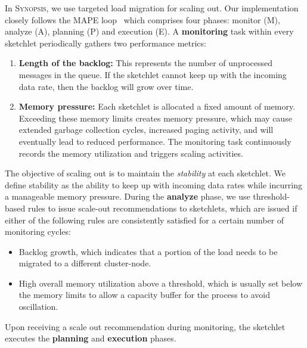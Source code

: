 In \textsc{Synopsis}, we use targeted load migration for scaling out.
Our implementation closely follows the MAPE loop~\cite{maurer2011revealing} which comprises four phases: monitor (M), analyze (A), planning (P) and execution (E).
A \textbf{monitoring} task within every sketchlet periodically gathers two performance metrics:
\begin{enumerate}[leftmargin=*]
	\item \textbf{Length of the backlog:} This represents the number of unprocessed messages in the queue. If the sketchlet cannot keep up with the incoming data rate, then the backlog will grow over time.
	\item \textbf{Memory pressure:} Each sketchlet is allocated a fixed amount of memory. 
	Exceeding these memory limits creates memory pressure, which may cause extended garbage collection cycles, increased paging activity, and will eventually lead to reduced performance.
	The monitoring task continuously records the memory utilization and triggers scaling activities.
\end{enumerate} 

The objective of scaling out is to maintain the \emph{stability} at each sketchlet.
We define stability as the ability to keep up with incoming data rates while incurring a manageable memory pressure.  During the \textbf{analyze} phase, we use threshold-based rules \cite{lorido2012auto} to issue scale-out recommendations to sketchlets, which are issued if either of the following rules are consistently satisfied for a certain number of monitoring cycles:
\begin{itemize}[leftmargin=*]  
\item Backlog growth, which indicates that a portion of the load needs to be migrated to a different cluster-node.
\item High overall memory utilization above a threshold, which is usually set below the memory limits to allow a capacity buffer for the process to avoid oscillation.
\end{itemize}
Upon receiving a scale out recommendation during monitoring, the sketchlet executes the \textbf{planning} and \textbf{execution} phases.

